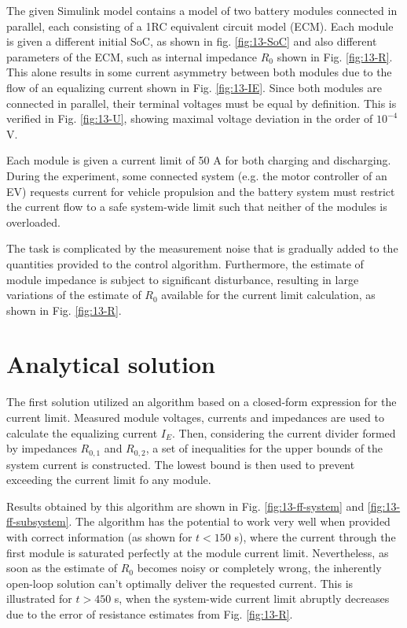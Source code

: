 The given Simulink model contains a model of two battery modules connected in parallel, each consisting of a 1RC equivalent circuit model (ECM). Each module is given a different initial SoC, as shown in fig. \ref{fig:13-SoC} and also different parameters of the ECM, such as internal impedance $R_0$ shown in Fig. \ref{fig:13-R}. This alone results in some current asymmetry between both modules due to the flow of an equalizing current shown in Fig. \ref{fig:13-IE}. Since both modules are connected in parallel, their terminal voltages must be equal by definition. This is verified in Fig. \ref{fig:13-U}, showing maximal voltage deviation in the order of $10^{-4}$ V.

Each module is given a current limit of 50 A for both charging and discharging. During the experiment, some connected system (e.g. the motor controller of an EV) requests current for vehicle propulsion and the battery system must restrict the current flow to a safe system-wide limit such that neither of the modules is overloaded.

The task is complicated by the measurement noise that is gradually added to the quantities provided to the control algorithm. Furthermore, the estimate of module impedance is subject to significant disturbance, resulting in large variations of the estimate of $R_0$ available for the current limit calculation, as shown in Fig. \ref{fig:13-R}.

\section{Analytical solution}

The first solution utilized an algorithm based on a closed-form expression for the current limit. Measured module voltages, currents and impedances are used to calculate the equalizing current $I_E$. Then, considering the current divider formed by impedances $R_{0,1}$ and $R_{0,2}$, a set of inequalities for the upper bounds of the system current is constructed. The lowest bound is then used to prevent exceeding the current limit fo any module.

Results obtained by this algorithm are shown in Fig. \ref{fig:13-ff-system} and \ref{fig:13-ff-subsystem}. The algorithm has the potential to work very well when provided with correct information (as shown for $t<150$ s), where the current through the first module is saturated perfectly at the module current limit. Nevertheless, as soon as the estimate of $R_0$ becomes noisy or completely wrong, the inherently open-loop solution can't optimally deliver the requested current. This is illustrated for $t > 450$ s, when the system-wide current limit abruptly decreases due to the error of resistance estimates from Fig. \ref{fig:13-R}.


